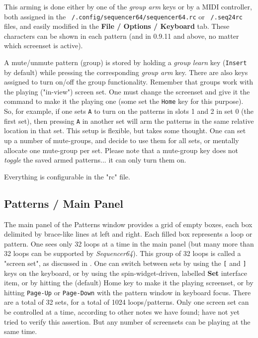    This arming is done either by one of the \textsl{group arm} keys
   or by a MIDI controller, both assigned in the
   \texttt{~/.config/sequencer64/sequencer64.rc} or \texttt{~/.seq24rc} files,
   and easily modified in the \textbf{File / Options / Keyboard} tab.
   These characters can be shown in each pattern (and in 0.9.11 and above, no
   matter which screenset is active).

   A mute/unmute pattern (group) is stored by holding a
   \textsl{group learn} key (\texttt{Insert} by default) while pressing the
   corresponding \textsl{group arm} key.
   There are also keys assigned to turn on/off the group functionality.
   Remember that groups work with the playing ("in-view") screen set.
   One must change the screenset and give it the command to make it the
   playing one
   (some set the \texttt{Home} key for this purpose).
   So, for example, if one sets \texttt{A} to turn on the
   patterns in slots 1 and 2 in set 0 (the first set), then pressing
   \texttt{A} in another set will arm the patterns in the same relative
   location in that set.
   This setup is flexible, but takes some thought.
   One can set up a number of mute-groups, and decide to use them
   for all sets, or mentally allocate one mute-group per set.
   Please note that a mute-group key does not \textsl{toggle} the saved
   armed patterns... it can only turn them on.

   Everything is configurable in the "rc" file.

\subsection{Patterns / Main Panel}
\label{subsec:seq64_patterns_panel_main}

   The main panel of the Patterns window provides a grid of empty boxes,
   each box delimited by brace-like lines at left and right.
   Each filled box represents a loop or pattern.
   One sees only 32 loops at a time in the main panel (but many more than
   32 loops can be supported by \textsl{Sequencer64}).
   This group of 32 loops is called a "screen set", as discussed in
   .
   One can switch between sets by using the
   \index{keys![}
   \texttt{[} and
   \index{keys!]}
   \texttt{]} keys on the keyboard, or by using
   the spin-widget-driven, labelled \textbf{Set} interface item, or
   by hitting the (default) Home key to make it the playing screenset,
   or by hitting \texttt{Page-Up} or \texttt{Page-Down} with the pattern window
   in keyboard focus.
   There are a total of 32 sets, for a total of 1024 loops/patterns. 
   Only one screen set can be controlled at a time, according to other notes we
   have found; have not yet tried to verify this assertion.  But any number of
   screensets can be playing at the same time.

